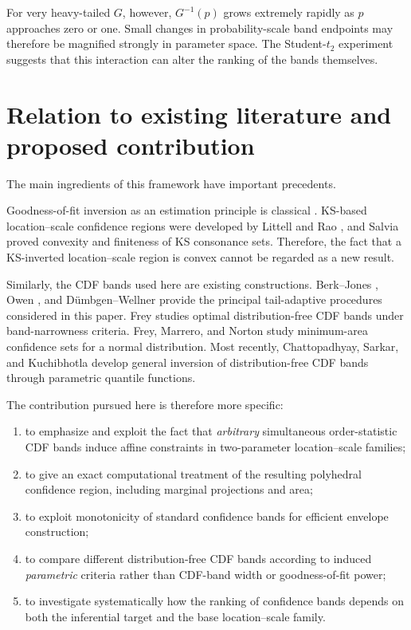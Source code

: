 \documentclass[11pt]{article}
\begin{document}
For very heavy-tailed $G$, however, $G^{-1}(p)$ grows extremely rapidly
as $p$ approaches zero or one.  Small changes in probability-scale band
endpoints may therefore be magnified strongly in parameter space.
The Student-$t_2$ experiment suggests that this interaction can alter
the ranking of the bands themselves.


\section{Relation to existing literature and proposed contribution}

The main ingredients of this framework have important precedents.

Goodness-of-fit inversion as an estimation principle is classical
\cite{Easterling1976}.  KS-based location--scale confidence regions were
developed by Littell and Rao \cite{LittellRao1978}, and Salvia
\cite{Salvia1980} proved convexity and finiteness of KS consonance sets.
Therefore, the fact that a KS-inverted location--scale region is convex
cannot be regarded as a new result.

Similarly, the CDF bands used here are existing constructions.
Berk--Jones \cite{BerkJones1979}, Owen \cite{Owen1995}, and
Dümbgen--Wellner \cite{DumbgenWellner2023} provide the principal
tail-adaptive procedures considered in this paper.  Frey
\cite{Frey2008} studies optimal distribution-free CDF bands under
band-narrowness criteria.  Frey, Marrero, and Norton
\cite{FreyMarreroNorton2009} study minimum-area confidence sets for a
normal distribution.  Most recently, Chattopadhyay, Sarkar, and
Kuchibhotla \cite{Chattopadhyay2026} develop general inversion of
distribution-free CDF bands through parametric quantile functions.

The contribution pursued here is therefore more specific:

\begin{enumerate}[label=(\roman*)]
    \item
    to emphasize and exploit the fact that \emph{arbitrary}
    simultaneous order-statistic CDF bands induce affine constraints in
    two-parameter location--scale families;

    \item
    to give an exact computational treatment of the resulting
    polyhedral confidence region, including marginal projections and
    area;

    \item
    to exploit monotonicity of standard confidence bands for efficient
    envelope construction;

    \item
    to compare different distribution-free CDF bands according to
    induced \emph{parametric} criteria rather than CDF-band width or
    goodness-of-fit power;

    \item
    to investigate systematically how the ranking of confidence bands
    depends on both the inferential target and the base
    location--scale family.
\end{enumerate}
\end{document}
